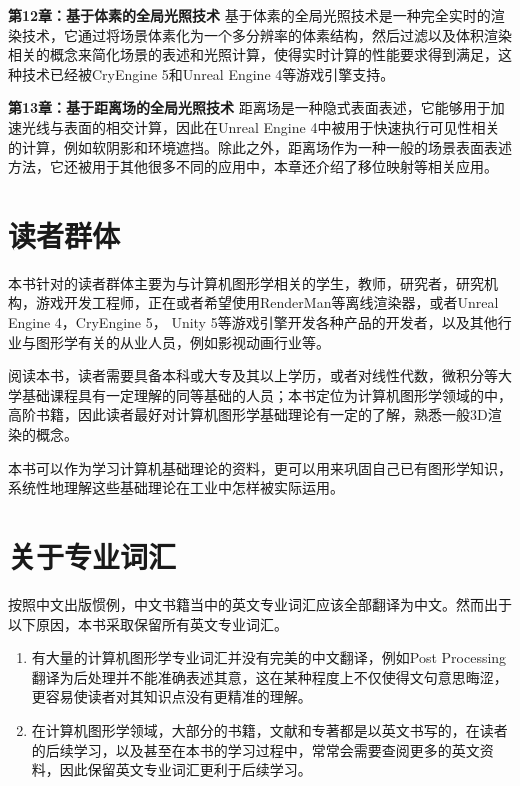 \textbf{第12章：基于体素的全局光照技术 } 基于体素的全局光照技术是一种完全实时的渲染技术，它通过将场景体素化为一个多分辨率的体素结构，然后过滤以及体积渲染相关的概念来简化场景的表述和光照计算，使得实时计算的性能要求得到满足，这种技术已经被CryEngine 5和Unreal Engine 4等游戏引擎支持。
	
\textbf{第13章：基于距离场的全局光照技术 } 距离场是一种隐式表面表述，它能够用于加速光线与表面的相交计算，因此在Unreal Engine 4中被用于快速执行可见性相关的计算，例如软阴影和环境遮挡。除此之外，距离场作为一种一般的场景表面表述方法，它还被用于其他很多不同的应用中，本章还介绍了移位映射等相关应用。



\section*{读者群体}
本书针对的读者群体主要为与计算机图形学相关的学生，教师，研究者，研究机构，游戏开发工程师，正在或者希望使用RenderMan等离线渲染器，或者Unreal Engine 4，CryEngine 5， Unity 5等游戏引擎开发各种产品的开发者，以及其他行业与图形学有关的从业人员，例如影视动画行业等。

阅读本书，读者需要具备本科或大专及其以上学历，或者对线性代数，微积分等大学基础课程具有一定理解的同等基础的人员；本书定位为计算机图形学领域的中，高阶书籍，因此读者最好对计算机图形学基础理论有一定的了解，熟悉一般3D渲染的概念。

本书可以作为学习计算机基础理论的资料，更可以用来巩固自己已有图形学知识，系统性地理解这些基础理论在工业中怎样被实际运用。



\section*{关于专业词汇}
按照中文出版惯例，中文书籍当中的英文专业词汇应该全部翻译为中文。然而出于以下原因，本书采取保留所有英文专业词汇。

\begin{enumerate}
	\item 有大量的计算机图形学专业词汇并没有完美的中文翻译，例如Post Processing翻译为后处理并不能准确表述其意，这在某种程度上不仅使得文句意思晦涩，更容易使读者对其知识点没有更精准的理解。
	\item 在计算机图形学领域，大部分的书籍，文献和专著都是以英文书写的，在读者的后续学习，以及甚至在本书的学习过程中，常常会需要查阅更多的英文资料，因此保留英文专业词汇更利于后续学习。
\end{enumerate}

